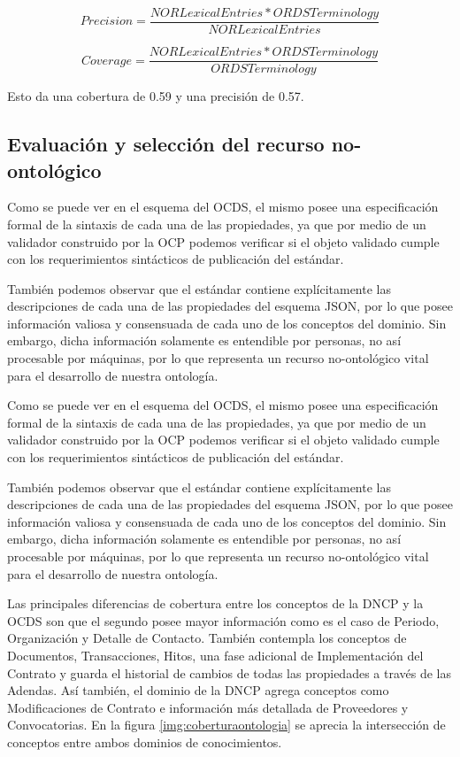 \begin{equation}
    Precision =  \frac{{NORLexicalEntries}*{ORDSTerminology} }{{NORLexicalEntries}}    
\end{equation}

\begin{equation}
     Coverage = \frac{{NORLexicalEntries}* {ORDSTerminology}}{{ORDSTerminology}}   
\end{equation}

Esto da una cobertura de 0.59 y una precisión de 0.57. 

\subsection{Evaluación y selección del recurso no-ontológico}

Como se puede ver en el esquema del OCDS, el mismo posee una especificación formal de la sintaxis de cada una de las propiedades, ya que por medio de un validador construido por la OCP podemos verificar si el objeto validado cumple con los requerimientos sintácticos de publicación del estándar.

También podemos observar que el estándar contiene explícitamente las descripciones de cada una de las propiedades del esquema JSON, por lo que posee información valiosa y consensuada de cada uno de los conceptos del dominio. Sin embargo, dicha información solamente es entendible por personas, no así procesable por máquinas, por lo que representa un recurso no-ontológico vital para el desarrollo de nuestra ontología.

Como se puede ver en el esquema del OCDS, el mismo posee una especificación formal de la sintaxis de cada una de las propiedades, ya que por medio de un validador construido por la OCP podemos verificar si el objeto validado cumple con los requerimientos sintácticos de publicación del estándar.

También podemos observar que el estándar contiene explícitamente las descripciones de cada una de las propiedades del esquema JSON, por lo que posee información valiosa y consensuada de cada uno de los conceptos del dominio. Sin embargo, dicha información solamente es entendible por personas, no así procesable por máquinas, por lo que representa un recurso no-ontológico vital para el desarrollo de nuestra ontología.



Las principales diferencias de cobertura entre los conceptos de la DNCP y la OCDS son que el segundo posee mayor información como es el caso de Periodo, Organización y Detalle de Contacto. También contempla los conceptos de Documentos, Transacciones, Hitos, una fase adicional de Implementación del Contrato y guarda el historial de cambios de todas las propiedades a través de las Adendas. Así también, el dominio de la DNCP agrega conceptos como Modificaciones de Contrato e información más detallada de Proveedores y Convocatorias. En la figura \ref{img:coberturaontologia} se aprecia la intersección de conceptos entre ambos dominios de conocimientos.

